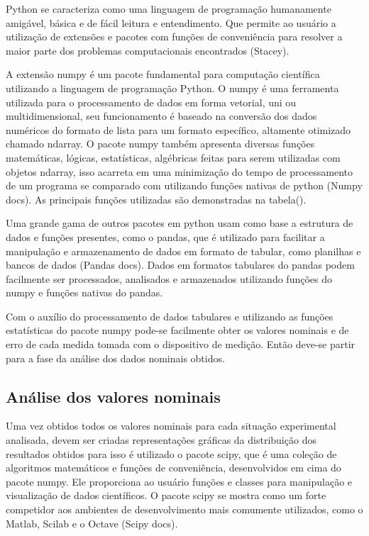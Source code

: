 Python se caracteriza como uma linguagem de programação humanamente amigável, básica e de fácil leitura e entendimento. Que permite ao usuário a utilização de extensões e pacotes com funções de conveniência para resolver a maior parte dos problemas computacionais encontrados (Stacey).

A extensão numpy é um pacote fundamental para computação científica utilizando a linguagem de programação Python. O numpy é uma ferramenta utilizada para o processamento de dados em forma vetorial, uni ou multidimensional, seu funcionamento é baseado na conversão dos dados numéricos do formato de lista para um formato específico, altamente otimizado chamado ndarray. O pacote numpy também apresenta diversas funções matemáticas, lógicas, estatísticas, algébricas feitas para serem utilizadas com objetos ndarray, isso acarreta em uma minimização do tempo de processamento de um programa se comparado com utilizando funções nativas de python (Numpy docs). As principais funções utilizadas são demonstradas na tabela().

Uma grande gama de outros pacotes em python usam como base a estrutura de dados e funções presentes, como o pandas, que é utilizado para facilitar a manipulação e armazenamento de dados em formato de tabular, como planilhas e bancos de dados (Pandas docs). Dados em formatos tabulares do pandas podem facilmente ser processados, analisados e armazenados utilizando funções do numpy e funções nativas do pandas.

Com o auxílio do processamento de dados tabulares e utilizando as funções estatísticas do pacote numpy pode-se facilmente obter os valores nominais e de erro de cada medida tomada com o dispositivo de medição. Então deve-se partir para a fase da análise dos dados nominais obtidos.

\subsection{Análise dos valores nominais}

Uma vez obtidos todos os valores nominais para cada situação experimental analisada, devem ser criadas representações gráficas da distribuição dos resultados obtidos para isso é utilizado o pacote scipy, que é uma coleção de algoritmos matemáticos e funções de conveniência, desenvolvidos em cima do pacote numpy. Ele proporciona ao usuário funções e classes para manipulação e visualização de dados científicos. O pacote scipy se mostra como um forte competidor aos ambientes de desenvolvimento mais comumente utilizados, como o Matlab, Scilab e o Octave (Scipy docs).

